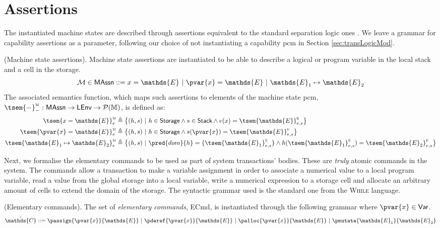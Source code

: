 \section{Assertions}

The instantiated machine states are described through assertions equivalent to the standard separation logic ones \cite{seplogic}. We leave a grammar for capability assertions as a parameter, following our choice of not instantiating a capability pcm in Section \ref{sec:transLogicMod}.
\begin{defn}
	(Machine state assertions).
	Machine state assertions are instantiated to be able to describe a logical or program variable in the local stack and a cell in the storage.
		\[
			\mathcal{M} \in \mathsf{MAssn} ::= x = \mathds{E}\ |\ \pvar{x} = \mathds{E}\ |\ \mathds{E}_1 \mapsto \mathds{E}_2
		\]
		The associated semantics function, which maps such assertions to elements of the machine state pcm, $\tsem{-}_-^\textsc{m} : \mathsf{MAssn} \rightarrow \mathsf{LEnv} \rightarrow \mathcal{P}(\mathbb{M})$, is defined as:
		\begin{align*}
			\tsem{x = \mathds{E}}^\textsc{m}_e &\triangleq \big\{ (h, s)\ |\ h \in \mathsf{Storage} \land s \in \mathsf{Stack} \land  e(x) = \tsem{\mathds{E}}^\textsc{e}_{e, s} \big\}
			\\
			\tsem{\pvar{x} = \mathds{E}}^\textsc{m}_e &\triangleq \big\{ (h, s)\ |\ h \in \mathsf{Storage} \land s(\pvar{x}) = \tsem{\mathds{E}}^\textsc{e}_{e, s} \big\}
			\\
			\tsem{\mathds{E}_1 \mapsto \mathds{E}_2}_e^\textsc{m} &\triangleq \big\{ (h, s)\ |\ \pred{dom}{h} = \{\tsem{\mathds{E}_1}_{e,s}^\textsc{e}\} \land h(\tsem{\mathds{E}_1}_{e,s}^\textsc{e}) = \tsem{\mathds{E}_2}_{e,s}^\textsc{e} \big\}
		\end{align*}
\end{defn}

Next, we formalise the elementary commands to be used as part of system transactions' bodies. These are \textit{truly} atomic commands in the system. The commands allow a transaction to make a variable assignment in order to associate a numerical value to a local program variable, read a value from the global storage into a local variable, write a numerical expression to a storage cell and allocate an arbitrary amount of cells to extend the domain of the storage. The syntactic grammar used is the standard one from the \textsc{While} language.
\begin{defn}
	\label{defn:ecmd}
	(Elementary commands).
	The set of \emph{elementary commands}, \textsf{ECmd}, is instantiated through the following grammar where $\pvar{x} \in \mathsf{Var}$.
	\[
		\hat{\mathds{C}} ::=
			\passign{\pvar{x}}{\mathds{E}}\
			|\ \pderef{\pvar{x}}{\mathds{E}}\
			|\ \palloc{\pvar{x}}{\mathds{E}}\
			|\ \pmutate{\mathds{E}_1}{\mathds{E}_2}
	\]
\end{defn}

